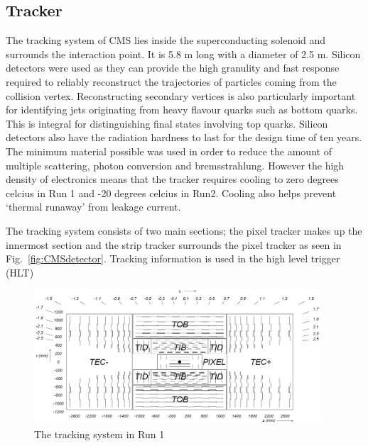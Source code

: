 \subsection{Tracker \label{sec:tracker}}

The tracking system of CMS lies inside the superconducting solenoid and surrounds the interaction point. It is 5.8 m long with a diameter of 2.5 m.
Silicon detectors were used as they can provide the high granulity and fast response required to reliably reconstruct the trajectories of particles coming from the collision vertex.
Reconstructing secondary vertices is also particularly important for identifying jets originating from heavy flavour quarks such as bottom quarks. This is integral for distinguishing final states involving top quarks. Silicon detectors also have the radiation hardness to last for the design time of ten years. The minimum material possible was used in order to reduce the amount of multiple scattering, photon conversion and bremsstrahlung. However the high density of electronics means that the tracker requires cooling to zero degrees celcius in Run 1 and -20 degrees celcius in Run2. Cooling also helps prevent `thermal runaway' from leakage current. 

The tracking system consists of two main sections; the pixel tracker makes up the innermost section and the strip tracker surrounds the pixel tracker as seen in Fig.~\ref{fig:CMSdetector}. Tracking information is used in the high level trigger (HLT)


\begin{figure}[ht!]
\centering
    \includegraphics[width=0.95\textwidth]{images/TrackerWhole.png}
    \caption{The tracking system in Run 1~\cite{1748-0221-3-08-S08004}}
    \label{fig:TrackerWhole}
\end{figure}


